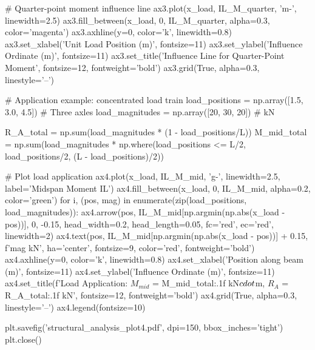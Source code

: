 \documentclass[11pt,a4paper]{article}
\begin{document}
\begin{pycode}
# Quarter-point moment influence line
ax3.plot(x_load, IL_M_quarter, 'm-', linewidth=2.5)
ax3.fill_between(x_load, 0, IL_M_quarter, alpha=0.3, color='magenta')
ax3.axhline(y=0, color='k', linewidth=0.8)
ax3.set_xlabel('Unit Load Position (m)', fontsize=11)
ax3.set_ylabel('Influence Ordinate (m)', fontsize=11)
ax3.set_title('Influence Line for Quarter-Point Moment', fontsize=12, fontweight='bold')
ax3.grid(True, alpha=0.3, linestyle='--')

# Application example: concentrated load train
load_positions = np.array([1.5, 3.0, 4.5])  # Three axles
load_magnitudes = np.array([20, 30, 20])  # kN

R_A_total = np.sum(load_magnitudes * (1 - load_positions/L))
M_mid_total = np.sum(load_magnitudes * np.where(load_positions <= L/2,
                                                 load_positions/2,
                                                 (L - load_positions)/2))

# Plot load application
ax4.plot(x_load, IL_M_mid, 'g-', linewidth=2.5, label='Midspan Moment IL')
ax4.fill_between(x_load, 0, IL_M_mid, alpha=0.2, color='green')
for i, (pos, mag) in enumerate(zip(load_positions, load_magnitudes)):
    ax4.arrow(pos, IL_M_mid[np.argmin(np.abs(x_load - pos))], 0, -0.15,
              head_width=0.2, head_length=0.05, fc='red', ec='red', linewidth=2)
    ax4.text(pos, IL_M_mid[np.argmin(np.abs(x_load - pos))] + 0.15,
             f'{mag} kN', ha='center', fontsize=9, color='red', fontweight='bold')
ax4.axhline(y=0, color='k', linewidth=0.8)
ax4.set_xlabel('Position along beam (m)', fontsize=11)
ax4.set_ylabel('Influence Ordinate (m)', fontsize=11)
ax4.set_title(f'Load Application: $M_{{mid}}$ = {M_mid_total:.1f} kN$\\cdot$m, $R_A$ = {R_A_total:.1f} kN',
              fontsize=12, fontweight='bold')
ax4.grid(True, alpha=0.3, linestyle='--')
ax4.legend(fontsize=10)

plt.savefig('structural_analysis_plot4.pdf', dpi=150, bbox_inches='tight')
plt.close()
\end{pycode}
\end{document}
